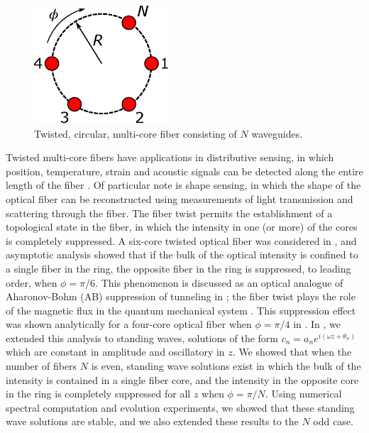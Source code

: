 \documentclass[11pt,reqno]{amsart}
\begin{document}
\begin{figure}
\begin{center}
\includegraphics[width=5cm]{circle}
\end{center}
\caption{Twisted, circular, multi-core fiber consisting of $N$ waveguides.}
\label{fig:circle}
\end{figure}

Twisted multi-core fibers have applications in distributive sensing, in which position, temperature, strain and acoustic signals can be detected along the entire length of the fiber \cite{Gannot2014,Westbrook2017}. Of particular note is shape sensing, in which the shape of the optical fiber can be reconstructed using measurements of light transmission and scattering through the fiber. The fiber twist permits the establishment of a topological state in the fiber, in which the intensity in one (or more) of the cores is completely suppressed. A six-core twisted optical fiber was considered in \cite{castro2016}, and asymptotic analysis showed that if the bulk of the optical intensity is confined to a single fiber in the ring, the opposite fiber in the ring is suppressed, to leading order, when $\phi = \pi/6$. This phenomenon is discussed as an optical analogue of Aharonov-Bohm (AB) suppression of tunneling in \cite{Ornigotti2007,Parto2017,Parto2019}; the fiber twist plays the role of the magnetic flux in the quantum mechanical system \cite{Loss1992}. This suppression effect was shown analytically for a four-core optical fiber when $\phi=\pi/4$ in \cite{Parto2019}. In \cite{parker2021}, we extended this analysis to standing waves, solutions of the form $c_n = a_n e^{i (\omega z + \theta_n) }$ which are constant in amplitude and oscillatory in $z$. We showed that when the number of fibers $N$ is even, standing wave solutions exist in which the bulk of the intensity is contained in a single fiber core, and the intensity in the opposite core in the ring is completely suppressed for all $z$ when $\phi = \pi/N$. Using numerical spectral computation and evolution experiments, we showed that these standing wave solutions are stable, and we also extended these results to the $N$ odd case.
\end{document}
